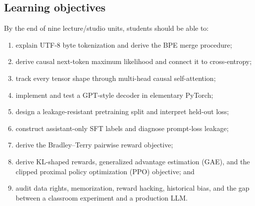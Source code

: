 \documentclass[11pt]{article}
\begin{document}
\subsection*{Learning objectives}
By the end of nine lecture/studio units, students should be able to:
\begin{enumerate}
\item explain UTF-8 byte tokenization and derive the BPE merge procedure;
\item derive causal next-token maximum likelihood and connect it to cross-entropy;
\item track every tensor shape through multi-head causal self-attention;
\item implement and test a GPT-style decoder in elementary PyTorch;
\item design a leakage-resistant pretraining split and interpret held-out loss;
\item construct assistant-only SFT labels and diagnose prompt-loss leakage;
\item derive the Bradley--Terry pairwise reward objective;
\item derive KL-shaped rewards, generalized advantage estimation (GAE), and
the clipped proximal policy optimization (PPO) objective; and
\item audit data rights, memorization, reward hacking, historical bias, and the
gap between a classroom experiment and a production LLM.
\end{enumerate}
\end{document}
